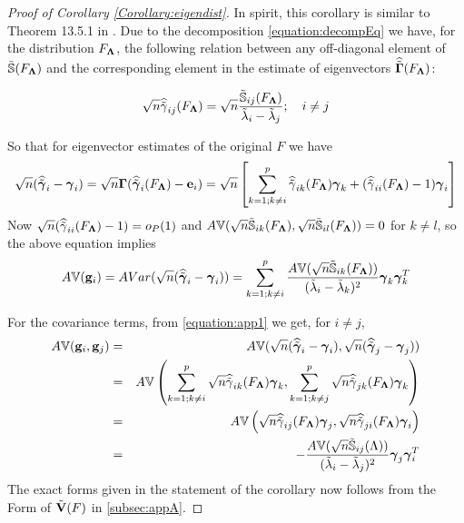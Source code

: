 \begin{proof}[Proof of Corollary \ref{Corollary:eigendist}]
In spirit, this corollary is similar to Theorem 13.5.1 in \cite{anderson}. Due to the decomposition \ref{equation:decompEq} we have, for the distribution $F_{\boldsymbol{\Lambda}}$, the following relation between any off-diagonal element of $\tilde {{\mathbb{S}}}(F_{\boldsymbol{\Lambda}})$ and the corresponding element in the estimate of eigenvectors $\widehat{\tilde {{\boldsymbol{\Gamma}}}} (F_{\boldsymbol{\Lambda}})$:

$$ \sqrt n \widehat{\tilde \gamma}_{ij} (F_{\boldsymbol{\Lambda}}) = \sqrt n \frac{{\tilde {{\mathbb{S}}}}_{ij} (F_{\boldsymbol{\Lambda}})}{\tilde \lambda_i - \tilde \lambda_j}; \quad i \neq j$$

So that for eigenvector estimates of the original $F$ we have
%
\begin{equation} \label{equation:app1}
\sqrt n (\widehat {\tilde {{\boldsymbol{\gamma}}}}_{i} - {\boldsymbol{\gamma}}_i) = \sqrt n {\boldsymbol{\Gamma}} (\widehat {\tilde {{\boldsymbol{\gamma}}}}_{i}(F_{\boldsymbol{\Lambda}}) - {\bf{e}}_i ) = \sqrt n \left[ \sum_{k=1; k \neq i}^p \widehat {\tilde \gamma}_{ik}(F_{\boldsymbol{\Lambda}}){\boldsymbol{\gamma}}_k + (\widehat {\tilde \gamma}_{ii}(F_{\boldsymbol{\Lambda}}) - 1){\boldsymbol{\gamma}}_i \right]
\end{equation}
%
Now $\sqrt n (\widehat {\tilde \gamma}_{ii}(F_{\boldsymbol{\Lambda}}) - 1) =  o_P(1)$ and $A{\mathbb{V}}(\sqrt n {\tilde {{\mathbb{S}}}}_{ik}(F_{\boldsymbol{\Lambda}}), \sqrt n {\tilde {{\mathbb{S}}}}_{il}(F_{\boldsymbol{\Lambda}})) = 0$ for $k \neq l$, so the above equation implies
%
$$ A{\mathbb{V}}({\bf{g}}_i) = AVar (\sqrt n (\widehat {\tilde {{\boldsymbol{\gamma}}}}_{i} - {\boldsymbol{\gamma}}_i)) = \sum_{k=1; k \neq i}^p \frac{A{\mathbb{V}}(\sqrt n {\tilde {{\mathbb{S}}}}_{ik}(F_{\boldsymbol{\Lambda}}))}{(\tilde \lambda_i - \tilde \lambda_k)^2} {\boldsymbol{\gamma}}_k {\boldsymbol{\gamma}}_k^T $$
%

For the covariance terms, from \ref{equation:app1} we get, for $i \neq j$,
%
\begin{eqnarray*}
A{\mathbb{V}}({\bf{g}}_i, {\bf{g}}_j) &=& A{\mathbb{V}}(\sqrt n (\widehat {\tilde {{\boldsymbol{\gamma}}}}_{i} - {\boldsymbol{\gamma}}_i), \sqrt n (\widehat {\tilde {{\boldsymbol{\gamma}}}}_{j} - {\boldsymbol{\gamma}}_j))\\
&=& A{\mathbb{V}} \left( \sum_{k=1; k \neq i}^p \sqrt n \widehat {\tilde \gamma}_{ik}(F_{\boldsymbol{\Lambda}}){\boldsymbol{\gamma}}_k, \sum_{k=1; k \neq j}^p \sqrt n \widehat {\tilde \gamma}_{jk}(F_{\boldsymbol{\Lambda}}){\boldsymbol{\gamma}}_k \right)\\
&=& A{\mathbb{V}} \left( \sqrt n \widehat {\tilde \gamma}_{ij}(F_{\boldsymbol{\Lambda}}){\boldsymbol{\gamma}}_j, \sqrt n \widehat {\tilde \gamma}_{ji}(F_{\boldsymbol{\Lambda}}){\boldsymbol{\gamma}}_i \right)\\
&=& - \frac{A{\mathbb{V}}(\sqrt n {\tilde {{\mathbb{S}}}}_{ij}(\Lambda))}{(\tilde \lambda_i - \tilde \lambda_j)^2} {\boldsymbol{\gamma}}_j {\boldsymbol{\gamma}}_i^T
\end{eqnarray*}
%
The exact forms given in the statement of the corollary now follows from the  Form of $\tilde {{\mathbf{V}}}(F)$ in \ref{subsec:appA}.


\end{proof}
